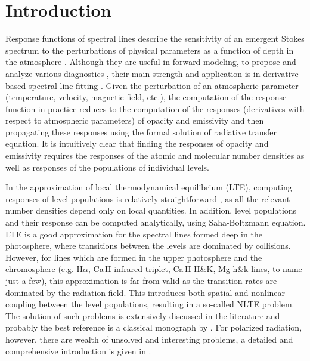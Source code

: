\documentclass{aa}
\begin{document}

   \maketitle


\section{Introduction}

Response functions of spectral lines \citep{Mein71, Beckers75, Landi77} describe the sensitivity of an emergent Stokes spectrum to the perturbations of physical parameters as a function of depth in the atmosphere \citep[for a detailed study of the possible diagnostics see][]{RFs94}. Although they are useful in forward modeling, to propose and analyze various diagnostics \citep[e.g.][]{Han06}, their main strength and application is in derivative-based spectral line fitting \citep[in solar physics widely known as ``inversion'', see for example][]{SIR}. Given the perturbation of an atmospheric parameter (temperature, velocity, magnetic field, etc.), the computation of the response function in practice reduces to the computation of the responses (derivatives with respect to atmospheric parameters) of opacity and emissivity and then propagating these responses using the formal solution of radiative transfer equation. It is intuitively clear that finding the responses of opacity and emissivity requires the responses of the atomic and molecular number densities as well as responses of the populations of individual levels. 

In the approximation of local thermodynamical equilibrium (LTE), computing responses of level populations is relatively straightforward \citep[e.g.][]{SIR, dtibook}, as all the relevant number densities depend only on local quantities. In addition, level populations and their response can be computed analytically, using Saha-Boltzmann equation. LTE is a good approximation for the spectral lines formed deep in the photosphere, where transitions between the levels are dominated by collisions. However, for lines which are formed in the upper photosphere and the chromosphere (e.g. H$\alpha$, Ca\,II infrared triplet, Ca\,II H\&K, Mg h\&k lines, to name just a few), this approximation is far from valid as the transition rates are dominated by the radiation field. This introduces both spatial and nonlinear coupling between the level populations, resulting in a so-called NLTE problem. The solution of such problems is extensively discussed in the literature and probably the best reference is a classical monograph by \citet{Mihalasbook} \citep[or a recent re-issue by][]{SAbook2014}. For polarized radiation, however, there are wealth of unsolved and interesting problems, a detailed and comprehensive introduction is given in \citet{LL04}.
\end{document}
